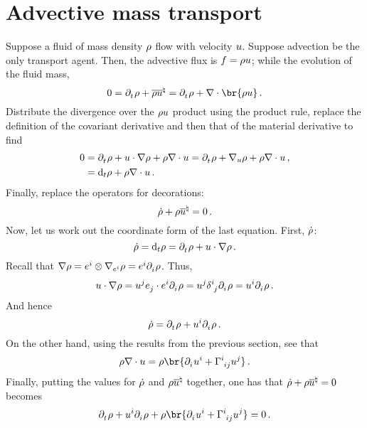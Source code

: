 \section{Advective mass transport}
\label{sec:advective-mass-transport}

Suppose a fluid of mass density $\rho$ flow with velocity $u$. Suppose advection be the only transport agent. Then, the advective flux is $f = \rho u$; while the evolution of the fluid mass,
%
\begin{equation*}
  0 = \cpd t\dens + \div{\dens\vel}
  = \cpd t\dens + \odiv{\br{\dens\vel}} \,.
\end{equation*}
%
Distribute the divergence over the $\rho u$ product using the product rule, replace the definition of the covariant derivative and then that of the material derivative to find
%
\begin{align*}
  0 &= \cpd t\dens + \vel\iprod\ograd\dens + \dens\ograd\iprod\vel
  = \cpd t\dens + \ocder\vel\dens + \dens\odiv\vel \,,\\
  &= \omdt t\dens + \dens\odiv\vel \,.
\end{align*}
%
Finally, replace the operators for decorations:
%
\begin{equation*}
  \dot{\rho} + \rho{\overline{u}}^{\natural} = 0\,.
\end{equation*}
%
Now, let us work out the coordinate form of the last equation. First, $\dot{\rho}$:
%
\begin{equation*}
  \mdt\dens = \omdt t\dens
  = \cpd t\dens + \vel\iprod\ograd\dens \,.
\end{equation*}
%
Recall that $\ograd\dens = \tbcov i\tprod\ocder{\tbcov i}\dens = \tbcov i\cpd i\dens$. Thus,
%
\begin{equation*}
  \vel\iprod\ograd\dens = \tvec\vel j\tbvec j\iprod\tbcov i\cpd i\dens
  = \tvec\vel j\tkron ij\cpd i\dens
  = \tvec\vel i\cpd i\dens \,.
\end{equation*}
%
And hence
%
\begin{equation*}
  \mdt\dens = \cpd t\dens + \tvec\vel i\cpd i\dens \,.
\end{equation*}
%
On the other hand, using the results from the previous section, see that
%
\begin{equation*}
  \dens\odiv\vel = \dens\br{\cpd i\tvec\vel i + \tchris iij\tvec\vel j} \,.
\end{equation*}
%
Finally, putting the values for $\dot{\rho}$ and $\rho{\overline{u}}^{\natural}$ together, one has that $\dot{\rho} + \rho{\overline{u}}^{\natural} = 0$ becomes
%
\begin{equation*}
  \cpd t\dens + \tvec\vel i\cpd i\dens
  + \dens\br{\cpd i\tvec\vel i + \tchris iij\tvec\vel j}
  = 0\,.
\end{equation*}


